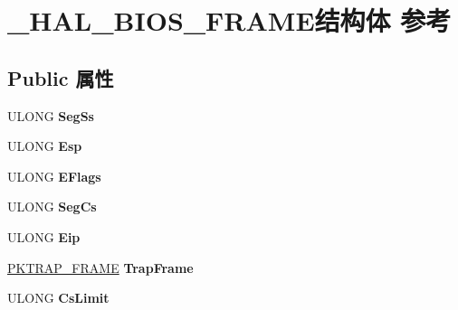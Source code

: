 \hypertarget{struct___h_a_l___b_i_o_s___f_r_a_m_e}{}\section{\+\_\+\+H\+A\+L\+\_\+\+B\+I\+O\+S\+\_\+\+F\+R\+A\+M\+E结构体 参考}
\label{struct___h_a_l___b_i_o_s___f_r_a_m_e}
\subsection*{Public 属性}
\begin{DoxyCompactItemize}
\item 
\mbox{\label{struct___h_a_l___b_i_o_s___f_r_a_m_e_a80ddb64407e53176e60079fc80575010}} 
U\+L\+O\+NG {\bfseries Seg\+Ss}
\item 
\mbox{\label{struct___h_a_l___b_i_o_s___f_r_a_m_e_afe9cc76ac82214476705a5ba22e67278}} 
U\+L\+O\+NG {\bfseries Esp}
\item 
\mbox{\label{struct___h_a_l___b_i_o_s___f_r_a_m_e_af79e93cb0901df78d5752b26308cc315}} 
U\+L\+O\+NG {\bfseries E\+Flags}
\item 
\mbox{\label{struct___h_a_l___b_i_o_s___f_r_a_m_e_a83590d7aec348d61d25598f77b6df2f9}} 
U\+L\+O\+NG {\bfseries Seg\+Cs}
\item 
\mbox{\label{struct___h_a_l___b_i_o_s___f_r_a_m_e_a80a562ea46fa0e851143893dafb111cf}} 
U\+L\+O\+NG {\bfseries Eip}
\item 
\mbox{\label{struct___h_a_l___b_i_o_s___f_r_a_m_e_a61cc889f216b006d5ea387022fc6e2d9}} 
\hyperlink{struct___k_t_r_a_p___f_r_a_m_e}{P\+K\+T\+R\+A\+P\+\_\+\+F\+R\+A\+ME} {\bfseries Trap\+Frame}
\item 
\mbox{\label{struct___h_a_l___b_i_o_s___f_r_a_m_e_a6b592037c83489865c0d7e561fec2017}} 
U\+L\+O\+NG {\bfseries Cs\+Limit}
\item 
\mbox{\label{struct___h_a_l___b_i_o_s___f_r_a_m_e_ad1355f6b3b6a3e297927867085ed380c}} 

\end{DoxyCompactItemize}
